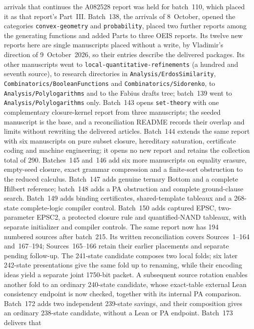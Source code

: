 \documentclass[11pt]{article}
\newcommand{\dir}[1]{\texttt{#1}}
\begin{document}
arrivals that continues the A082528 report was held for batch~110, which
placed it as that report's Part~III.
Batch~138, the arrivals of 8~October, opened the categories
\dir{convex-geometry} and \dir{probability}, placed two further reports
among the generating functions and added Parts to three OEIS reports.  Its
twelve new reports here are single manuscripts placed without a write, by
Vladimir's direction of 9~October~2026, so their entries describe the
delivered packages.  Its other manuscripts went to
\dir{local-quantitative-refinements} (a hundred and seventh source), to
research directories in \dir{Analysis/ErdosSimilarity},
\dir{Combinatorics/BooleanFunctions} and \dir{Combinatorics/Sidorenko}, to
\dir{Analysis/Polylogarithms} and to the Fabius drafts tree; batch~139
went to \dir{Analysis/Polylogarithms} only. Batch~143 opens \dir{set-theory}
with one complementary closure-kernel report from three manuscripts; the
seeded manuscript is the base, and a reconciliation README records their
overlap and limits without rewriting the delivered articles. Batch~144
extends the same report with six manuscripts on pure subset closure,
hereditary saturation, certificate coding and machine engineering; it opens
no new report and retains the collection total of 290. Batches~145 and~146
add six more manuscripts on equality erasure, empty-seed closure, exact
grammar compression and a finite-sort obstruction to the reduced calculus.
Batch~147 adds genuine ternary Bottom and a complete Hilbert reference;
batch~148 adds a PA obstruction and complete ground-clause search.
Batch~149 adds binding certificates, shared-template tableaux and a
268-state complete-logic compiler control. Batch~150 adds captured EPSC,
two-parameter EPSC2, a protected closure rule and quantified-NAND tableaux,
with separate initializer and compiler controls. The same report now has
194 numbered sources after batch~215. Its written reconciliation covers
Sources~1--164 and~167--194; Sources~165--166 retain their earlier placements
and separate pending follow-up. The 241-state candidate composes
two local folds; six later 242-state presentations give the same fold up
to renaming, while their encoding ideas yield a separate joint 1750-bit
packet. A subsequent source rotation enables another fold to an ordinary
240-state candidate, whose exact-table external Lean consistency endpoint is
now checked, together with its internal PA comparison. Batch~172 adds two
independent 239-state savings, and their composition gives an ordinary
238-state candidate, without a Lean or PA endpoint. Batch~173 delivers that
\end{document}
